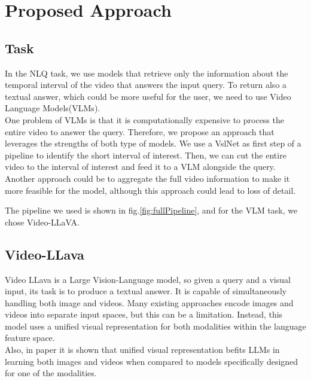 \documentclass[10pt,twocolumn,letterpaper]{article}
\begin{document}
\section{Proposed Approach}
\subsection{Task}
In the NLQ task, we use models that retrieve only the
information about the temporal interval of the video that
answers the input query. To return also a textual answer,
which could be more useful for the user, we need to use
Video Language Models(VLMs).\\
One problem of VLMs is that it is computationally expensive to process the entire video to answer the query. Therefore, we propose an approach that leverages the strengths of both type of models. We use a VslNet as first step of a pipeline to identify the short interval of interest. Then, we can cut the entire video to the interval of interest and feed it to a VLM alongside the query.
Another approach could be to aggregate the full video information to make it more feasible for the model, although  this approach could lead to loss of detail.

The pipeline we used is shown in fig.\ref{fig:fullPipeline}, and for the VLM task, we chose Video-LLaVA.

\subsection{Video-LLava}
\label{subsec:videolava}
Video LLava is a Large Vision-Language model, so given a query and a visual input, its task is to produce a textual answer.  It is capable of simultaneously handling both image and videos. Many existing approaches encode images and videos into separate input spaces, but this can be a limitation. Instead, this model uses a unified visual representation for both modalities within the language feature space.\\
Also, in paper \cite{b8} it is shown that unified visual representation befits LLMs in learning both images and videos when compared to models specifically designed for one of the modalities.
\end{document}
